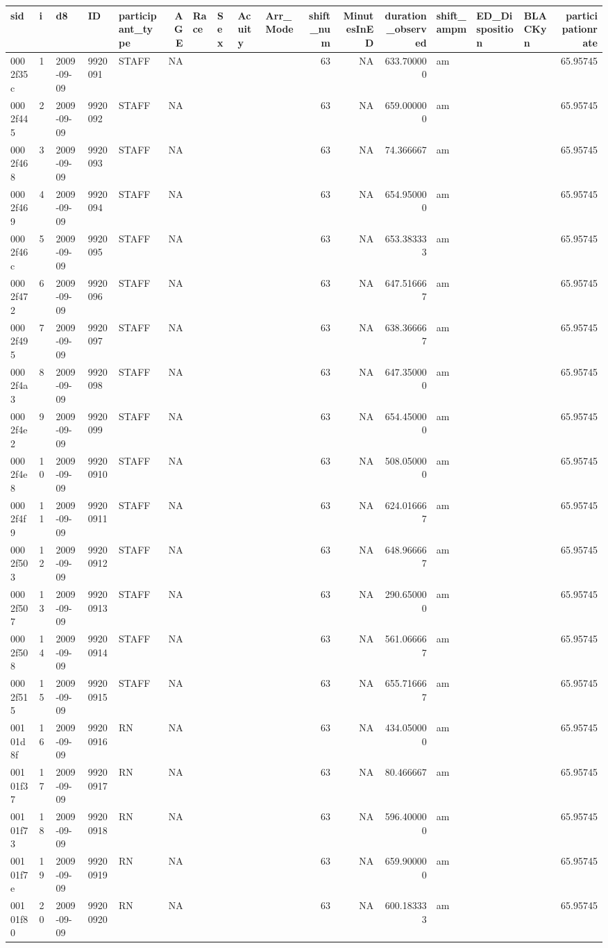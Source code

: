 \documentclass[]{elsarticle} %
\begin{document}
\begin{longtable}[]{@{}lllllrllllrrrlllr@{}}
\toprule
sid & i & d8 & ID & participant\_type & AGE & Race & Sex & Acuity &
Arr\_Mode & shift\_num & MinutesInED & duration\_observed & shift\_ampm
& ED\_Disposition & BLACKyn & participationrate\tabularnewline
\midrule
\endhead
0002f35c & 1 & 2009-09-09 & 9920091 & STAFF & NA & & & & & 63 & NA &
633.700000 & am & & & 65.95745\tabularnewline
0002f445 & 2 & 2009-09-09 & 9920092 & STAFF & NA & & & & & 63 & NA &
659.000000 & am & & & 65.95745\tabularnewline
0002f468 & 3 & 2009-09-09 & 9920093 & STAFF & NA & & & & & 63 & NA &
74.366667 & am & & & 65.95745\tabularnewline
0002f469 & 4 & 2009-09-09 & 9920094 & STAFF & NA & & & & & 63 & NA &
654.950000 & am & & & 65.95745\tabularnewline
0002f46c & 5 & 2009-09-09 & 9920095 & STAFF & NA & & & & & 63 & NA &
653.383333 & am & & & 65.95745\tabularnewline
0002f472 & 6 & 2009-09-09 & 9920096 & STAFF & NA & & & & & 63 & NA &
647.516667 & am & & & 65.95745\tabularnewline
0002f495 & 7 & 2009-09-09 & 9920097 & STAFF & NA & & & & & 63 & NA &
638.366667 & am & & & 65.95745\tabularnewline
0002f4a3 & 8 & 2009-09-09 & 9920098 & STAFF & NA & & & & & 63 & NA &
647.350000 & am & & & 65.95745\tabularnewline
0002f4e2 & 9 & 2009-09-09 & 9920099 & STAFF & NA & & & & & 63 & NA &
654.450000 & am & & & 65.95745\tabularnewline
0002f4e8 & 10 & 2009-09-09 & 99200910 & STAFF & NA & & & & & 63 & NA &
508.050000 & am & & & 65.95745\tabularnewline
0002f4f9 & 11 & 2009-09-09 & 99200911 & STAFF & NA & & & & & 63 & NA &
624.016667 & am & & & 65.95745\tabularnewline
0002f503 & 12 & 2009-09-09 & 99200912 & STAFF & NA & & & & & 63 & NA &
648.966667 & am & & & 65.95745\tabularnewline
0002f507 & 13 & 2009-09-09 & 99200913 & STAFF & NA & & & & & 63 & NA &
290.650000 & am & & & 65.95745\tabularnewline
0002f508 & 14 & 2009-09-09 & 99200914 & STAFF & NA & & & & & 63 & NA &
561.066667 & am & & & 65.95745\tabularnewline
0002f515 & 15 & 2009-09-09 & 99200915 & STAFF & NA & & & & & 63 & NA &
655.716667 & am & & & 65.95745\tabularnewline
00101d8f & 16 & 2009-09-09 & 99200916 & RN & NA & & & & & 63 & NA &
434.050000 & am & & & 65.95745\tabularnewline
00101f37 & 17 & 2009-09-09 & 99200917 & RN & NA & & & & & 63 & NA &
80.466667 & am & & & 65.95745\tabularnewline
00101f73 & 18 & 2009-09-09 & 99200918 & RN & NA & & & & & 63 & NA &
596.400000 & am & & & 65.95745\tabularnewline
00101f7e & 19 & 2009-09-09 & 99200919 & RN & NA & & & & & 63 & NA &
659.900000 & am & & & 65.95745\tabularnewline
00101f80 & 20 & 2009-09-09 & 99200920 & RN & NA & & & & & 63 & NA &
600.183333 & am & & & 65.95745\tabularnewline

\end{longtable}
\end{document}
